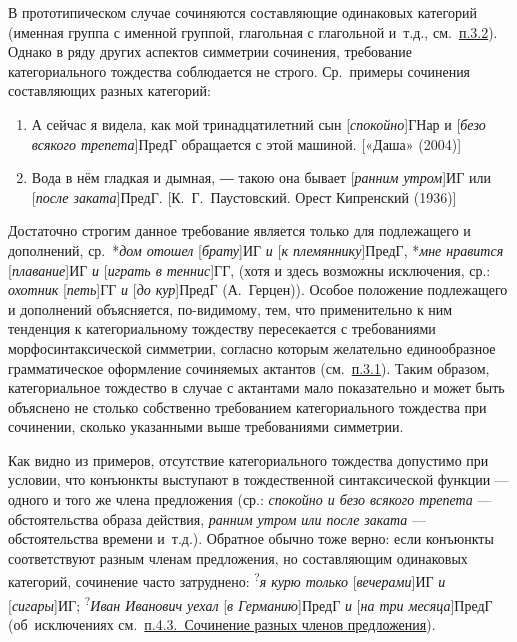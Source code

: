 В прототипическом случае сочиняются составляющие одинаковых категорий
(именная группа с именной группой, глагольная с глагольной и~т.д.,
см.~\underline{п.3.2}). Однако в ряду других аспектов симметрии
сочинения, требование категориального тождества соблюдается не строго.
Ср.~примеры сочинения составляющих разных категорий:

\begin{enumerate}
\def\labelenumi{(\arabic{enumi})}
\setcounter{enumi}{30}
\item
  А сейчас я видела, как мой тринадцатилетний сын
  {[}\textit{спокойно}{]}ГНар и {[}\textit{безо всякого трепета}{]}ПредГ
  обращается с этой машиной. {[}«Даша» (2004){]}
\item
  Вода в нём гладкая и дымная, ― такою она бывает {[}\textit{ранним
  утром}{]}ИГ или {[}\textit{после заката}{]}ПредГ. {[}К.~Г.~Паустовский.
  Орест Кипренский (1936){]}
\end{enumerate}

Достаточно строгим данное требование является только для подлежащего и
дополнений, ср.~*\textit{дом отошел} {[}\textit{брату}{]}ИГ \textit{и}
{[}\textit{к племяннику}{]}ПредГ, *\textit{мне нравится}
{[}\textit{плавание}{]}ИГ \textit{и} {[}\textit{играть в теннис}{]}ГГ, (хотя и
здесь возможны исключения, ср.: \textit{охотник} {[}\textit{петь}{]}ГГ
\textit{и} {[}\textit{до кур}{]}ПредГ (А.~Герцен)). Особое положение
подлежащего и дополнений объясняется, по-видимому, тем, что
применительно к ним тенденция к категориальному тождеству пересекается с
требованиями морфосинтаксической симметрии, согласно которым желательно
единообразное грамматическое оформление сочиняемых актантов
(см.~\underline{п.3.1}). Таким образом, категориальное тождество в
случае с актантами мало показательно и может быть объяснено не столько
собственно требованием категориального тождества при сочинении, сколько
указанными выше требованиями симметрии.

Как видно из примеров, отсутствие категориального тождества допустимо
при условии, что конъюнкты выступают в тождественной синтаксической
функции --- одного и того же члена предложения (ср.: \textit{спокойно и
безо всякого трепета} --- обстоятельства образа действия, \textit{ранним
утром или после заката} --- обстоятельства времени и~т.д.). Обратное
обычно тоже верно: если конъюнкты соответствуют разным членам
предложения, но составляющим одинаковых категорий, сочинение часто
затруднено: \textsuperscript{?}\textit{я курю только}
{[}\textit{вечерами}{]}ИГ \textit{и} {[}\textit{сигары}{]}ИГ;
\textsuperscript{?}\textit{Иван Иванович уехал} {[}\textit{в
Германию}{]}ПредГ \textit{и} {[}\textit{на три месяца}{]}ПредГ
(об~исключениях см.~\underline{п.4.3.~Сочинение разных членов
предложения}).

